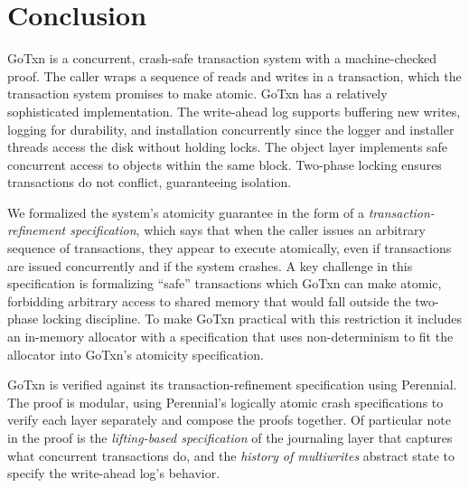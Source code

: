 \section{Conclusion}
\label{sec:txn:concl}

GoTxn is a concurrent, crash-safe transaction system with a machine-checked
proof. The caller wraps a sequence of reads and writes in a transaction, which
the transaction system promises to make atomic. GoTxn has a relatively
sophisticated implementation. The write-ahead log supports buffering new writes,
logging for durability, and installation concurrently since the logger and
installer threads access the disk without holding locks. The object layer implements
safe concurrent access to objects within the same block. Two-phase locking
ensures transactions do not conflict, guaranteeing isolation.

We formalized the system's atomicity guarantee in the form of a
\emph{transaction-refinement specification}, which says that when the caller issues an arbitrary
sequence of transactions, they appear to execute atomically, even if
transactions are issued concurrently and if the system crashes. A key challenge
in this specification is formalizing ``safe'' transactions which GoTxn can make
atomic, forbidding arbitrary access to shared memory that would fall outside the
two-phase locking discipline. To make GoTxn practical with this restriction it
includes an in-memory allocator with a specification that uses non-determinism
to fit the allocator into GoTxn's atomicity specification.

GoTxn is verified against its transaction-refinement specification using Perennial.
The proof is modular, using Perennial's logically atomic crash specifications to
verify each layer separately and compose the proofs together. Of particular note
in the proof is the \emph{lifting-based specification} of the
journaling layer that captures what concurrent transactions do, and the
\emph{history of multiwrites} abstract state to specify the write-ahead log's behavior.
